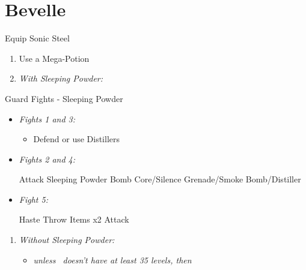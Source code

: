 \chapter{Bevelle}
\begin{equip}
	\begin{itemize}
		\tidusf Equip Sonic Steel
	\end{itemize}
\end{equip}
\begin{enumerate}
	\item Use a Mega-Potion
	\item \textit{With Sleeping Powder:}
\end{enumerate}
\begin{battle}{Guard Fights - Sleeping Powder}
	\begin{itemize}
		\item \textit{Fights 1 and 3:}
		      \begin{itemize}
			      \tidusf Attack
			      \item Defend or use Distillers
		      \end{itemize}
		\item \textit{Fights 2 and 4:}
		      \begin{itemize}
			      \tidusf Attack
			      \rikkuf Sleeping Powder
			      \kimahrif Bomb Core/Silence Grenade/Smoke Bomb/Distiller
		      \end{itemize}
		\item \textit{Fight 5:}
		      \begin{itemize}
			      \tidusf Haste \rikku
			      \rikkuf Throw Items x2
			      \tidusf Attack
		      \end{itemize}
	\end{itemize}
\end{battle}
\begin{enumerate}[resume]
	\item \textit{Without Sleeping Powder:}
	      \begin{itemize}
		      \item \formation{\tidus}{\rikku}{\auron} \textit{unless \lulu\ doesn't have at least 35 levels, then } \formation{\tidus}{\rikku}{\lulu}
	      \end{itemize}
\end{enumerate}
